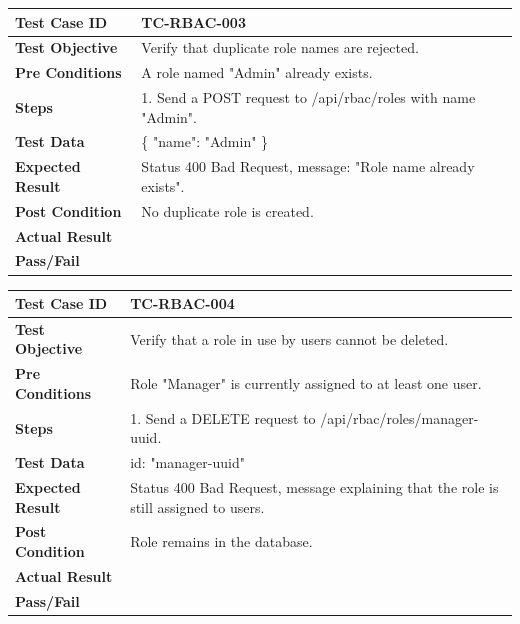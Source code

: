 \begin{longtable}{|p{}|p{}|}
\hline
\textbf{Test Case ID} & TC-RBAC-003 \\ \hline
\textbf{Test Objective} & Verify that duplicate role names are rejected. \\ \hline
\textbf{Pre Conditions} & A role named "Admin" already exists. \\ \hline
\textbf{Steps} & 
1. Send a POST request to /api/rbac/roles with name "Admin". \\ \hline
\textbf{Test Data} & \{ "name": "Admin" \} \\ \hline
\textbf{Expected Result} & Status 400 Bad Request, message: "Role name already exists". \\ \hline
\textbf{Post Condition} & No duplicate role is created. \\ \hline
\textbf{Actual Result} &  \\ \hline
\textbf{Pass/Fail} &  \\ \hline
\end{longtable}

\begin{longtable}{|p{}|p{}|}
\hline
\textbf{Test Case ID} & TC-RBAC-004 \\ \hline
\textbf{Test Objective} & Verify that a role in use by users cannot be deleted. \\ \hline
\textbf{Pre Conditions} & Role "Manager" is currently assigned to at least one user. \\ \hline
\textbf{Steps} & 
1. Send a DELETE request to /api/rbac/roles/manager-uuid. \\ \hline
\textbf{Test Data} & id: "manager-uuid" \\ \hline
\textbf{Expected Result} & Status 400 Bad Request, message explaining that the role is still assigned to users. \\ \hline
\textbf{Post Condition} & Role remains in the database. \\ \hline
\textbf{Actual Result} &  \\ \hline
\textbf{Pass/Fail} &  \\ \hline
\end{longtable}

